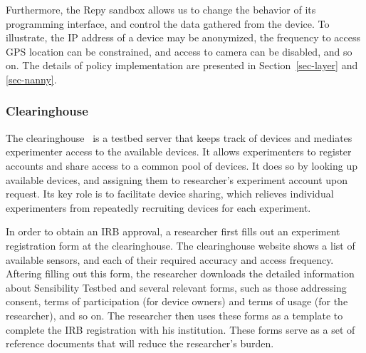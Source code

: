 Furthermore, the Repy sandbox allows us to change the 
behavior of its programming interface, and control the 
data gathered from the device. 
To illustrate, the IP address of a device may be anonymized, 
the frequency to access GPS location can be constrained, and 
access to camera can be disabled, and so on. 
The details of policy implementation are presented in 
Section~\ref{sec-layer} and \ref{sec-nanny}.

\subsubsection{Clearinghouse}\label{sec-ch}
The clearinghouse~\cite{ch} is a testbed server that keeps 
track of devices and mediates experimenter access to the 
available devices. It allows experimenters to register 
accounts and share access to a common pool of devices.
It does so by looking up available devices, and assigning
them to researcher's experiment account upon request. 
Its key role is to facilitate device sharing, 
which relieves individual experimenters from repeatedly 
recruiting devices for each experiment.

In order to obtain an IRB approval, a researcher first fills out an experiment
registration form  at the 
clearinghouse. The clearinghouse website shows 
a list of available sensors, and each of their required accuracy 
and access frequency. Aftering filling out this form, the researcher 
downloads the detailed information about Sensibility Testbed and 
several relevant forms, such as 
those addressing consent, terms of participation (for device owners) 
and terms of usage (for the researcher), and so on. The researcher then uses 
these forms as a template to complete the IRB registration with his institution.
These forms serve as a set of reference documents 
 that will reduce the researcher's burden. 

